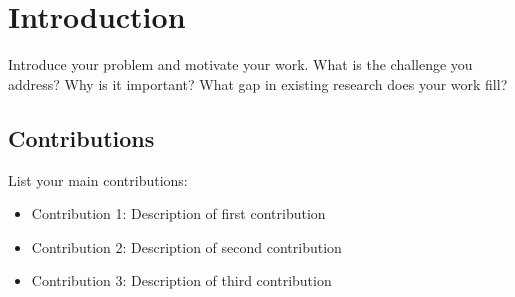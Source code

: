 \documentclass{article}
\begin{document}

\printAffiliationAndNotice{}  %

\begin{abstract}
Your abstract should briefly summarize the main contributions of your paper.
It should be a concise paragraph (typically 150-250 words) that covers:
the problem you address, your approach, key results, and implications.
Do not include citations or mathematical notation in the abstract.
\end{abstract}

\section{Introduction}
\label{sec:introduction}

Introduce your problem and motivate your work. What is the challenge you address?
Why is it important? What gap in existing research does your work fill?

\subsection{Contributions}

List your main contributions:
\begin{itemize}
    \item Contribution 1: Description of first contribution
    \item Contribution 2: Description of second contribution
    \item Contribution 3: Description of third contribution
\end{itemize}
\end{document}
